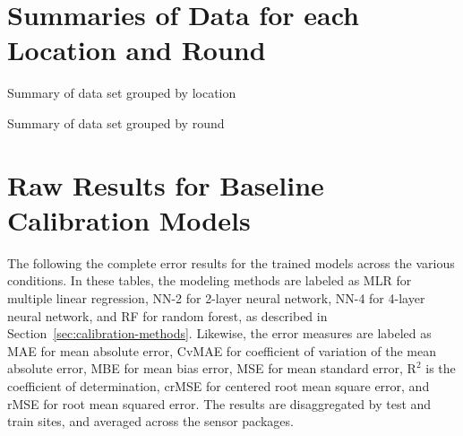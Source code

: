 \documentclass[journal abbreviation, manuscript]{copernicus}
\begin{document}
\section{Summaries of Data for each Location and Round}
\label{sec:summaryresults}

\begin{table}[H]
\scriptsize

\caption{Summary of data set grouped by location}
\label{tab:locationsummary}
\end{table}

\begin{table}[H]
\scriptsize

\caption{Summary of data set grouped by round}
\label{tab:roundsummary}
\end{table}

\section{Raw Results for Baseline Calibration Models}
\label{sec:simpleresults}
The following the complete error results for the trained models across the various conditions.  In these tables, the modeling methods are labeled as MLR for multiple linear regression, NN-2 for 2-layer neural network, NN-4 for 4-layer neural network, and RF for random forest, as described in Section~\ref{sec:calibration-methods}.  Likewise, the error measures are labeled as MAE for mean absolute error, CvMAE for coefficient of variation of the mean absolute error, MBE for mean bias error, MSE for mean standard error, $\textrm{R}^2$ is the coefficient of determination, crMSE for centered root mean square error, and rMSE for root mean squared error.  The results are disaggregated by test and train sites, and averaged across the sensor packages.















\end{document}
